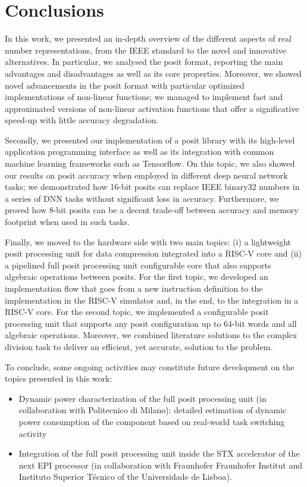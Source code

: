 \chapter{Conclusions}
In this work, we presented an in-depth overview of the different aspects of real number representations, from the IEEE standard to the novel and innovative alternatives. In particular, we analysed the posit format, reporting the main advantages and disadvantages as well as its core properties. Moreover, we showed novel advancements in the posit format with particular optimized implementations of non-linear functions; we managed to implement fast and approximated versions of non-linear activation functions that offer a significative speed-up with little accuracy degradation.

Secondly, we presented our implementation of a posit library with its high-level application programming interface as well as its integration with common machine learning frameworks such as Tensorflow. On this topic, we also showed our results on posit accuracy when employed in different deep neural network tasks; we demonstrated how 16-bit posits can replace IEEE binary32 numbers in a series of DNN tasks without significant loss in accuracy. Furthermore, we proved how 8-bit posits can be a decent trade-off between accuracy and memory footprint when used in such tasks.

Finally, we moved to the hardware side with two main topics: (i) a lightweight posit processing unit for data compression integrated into a RISC-V core and (ii) a pipelined full posit processing unit configurable core that also supports algebraic operations between posits. For the first topic, we developed an implementation flow that goes from a new instruction definition to the implementation in the RISC-V simulator and, in the end, to the integration in a RISC-V core. For the second topic, we implemented a configurable posit processing unit that supports any posit configuration up to 64-bit words and all algebraic operations. Moreover, we combined literature solutions to the complex division task to deliver an efficient, yet accurate, solution to the problem.

To conclude, some ongoing activities may constitute future development on the topics presented in this work:
\begin{itemize}
    \item Dynamic power characterization of the full posit processing unit (in collaboration with Politecnico di Milano): detailed estimation of dynamic power consumption of the component based on real-world task switching activity
    \item Integration of the full posit processing unit inside the STX accelerator of the next EPI processor (in collaboration with Fraunhofer Fraunhofer Institut and Instituto Superior Técnico of the Universidade de Lisboa).
\end{itemize}